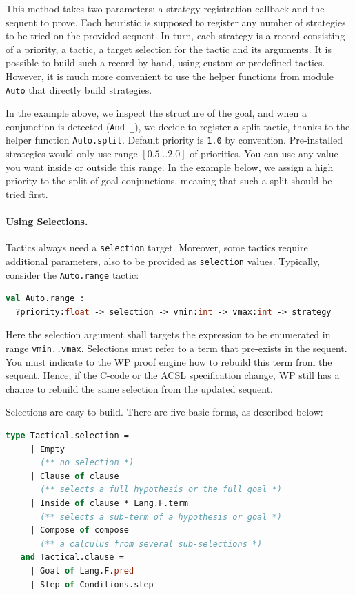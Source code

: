 This method takes two parameters: a strategy registration callback and the sequent to prove. Each heuristic
is supposed to register any number of strategies to be tried on the provided sequent. In turn, each strategy
is a record consisting of a priority, a tactic, a target selection for the tactic and its arguments.
It is possible to build such a record by hand, using custom or predefined tactics. However, it is much more convenient
to use the helper functions from module \lstinline$Auto$ that directly build strategies.

In the example above, we inspect the structure of the goal, and when a conjunction is detected (\lstinline$And _$),
we decide to register a split tactic, thanks to the helper function \lstinline$Auto.split$. Default priority is \lstinline$1.0$ by convention. Pre-installed strategies would only use range $[0.5\ldots2.0]$ of priorities. You can use any value you want inside or outside this range. In the example below, we assign a high priority to the split of goal conjunctions, meaning that such a split should be tried first.

\paragraph{Using Selections.} Tactics always need a \lstinline$selection$ target. Moreover, some tactics require additional parameters, also to be provided as \lstinline$selection$ values. Typically, consider the \lstinline$Auto.range$ tactic:

\begin{lstlisting}[language=ocaml]
val Auto.range :
  ?priority:float -> selection -> vmin:int -> vmax:int -> strategy
\end{lstlisting}

Here the selection argument shall targets the expression to be enumerated in range \lstinline$vmin..vmax$.
Selections must refer to a term that pre-exists in the sequent. You must indicate to the \textsf{WP} proof engine
how to rebuild this term from the sequent. Hence, if the \textsf{C}-code or the \textsf{ACSL} specification change,
\textsf{WP} still has a chance to rebuild the same selection from the updated sequent.

Selections are easy to build. There are five basic forms, as described below:
\begin{lstlisting}[language=ocaml]
   type Tactical.selection =
     | Empty
       (** no selection *)
     | Clause of clause
       (** selects a full hypothesis or the full goal *)
     | Inside of clause * Lang.F.term
       (** selects a sub-term of a hypothesis or goal *)
     | Compose of compose
       (** a calculus from several sub-selections *)
   and Tactical.clause =
     | Goal of Lang.F.pred
     | Step of Conditions.step
\end{lstlisting}

